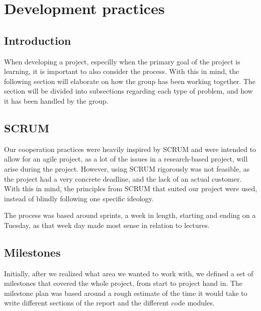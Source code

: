 \section{Development practices}
\subsection{Introduction}
When developing a project, especilly when the primary goal of the project is learning, it is important to also consider the process.
With this in mind, the following section will elaborate on how the group has been working together.
The section will be divided into subsections regarding each type of problem, and how it has been handled by the group.

\subsection{SCRUM}
Our cooperation practices were heavily inspired by SCRUM and were intended to allow for an agile project, as a lot of the issues in a research-based project, will arise during the project.
However, using SCRUM rigorously was not feasible, as the project had a very concrete deadline, and the lack of an actual customer.
With this in mind, the principles from SCRUM that suited our project were used, instead of blindly following one specific ideology.


The process was based around sprints, a week in length, starting and ending on a Tuesday, as that week day made most sense in relation to lectures.

\subsection{Milestones}
Initially, after we realized what area we wanted to work with, we defined a set of milestones that covered the whole project, from start to project hand in.
The milestone plan was based around a rough estimate of the time it would take to write different sections of the report and the different code modules.

